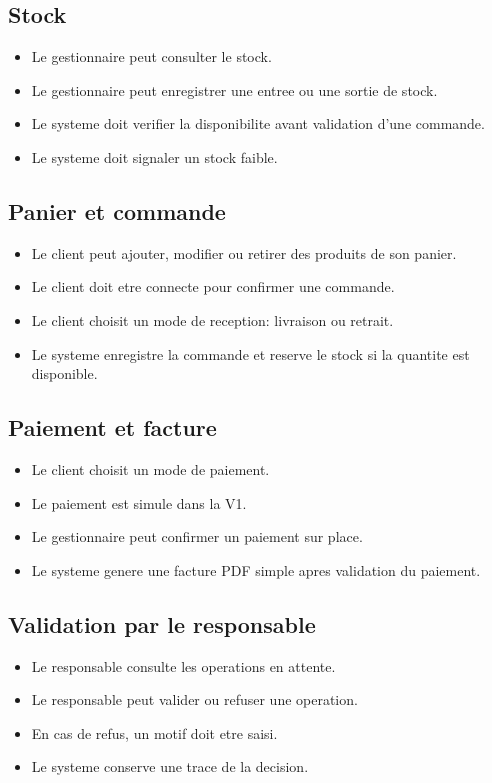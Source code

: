 \documentclass[12pt,a4paper]{article}
\begin{document}
\subsection{Stock}
\begin{itemize}
  \item Le gestionnaire peut consulter le stock.
  \item Le gestionnaire peut enregistrer une entree ou une sortie de stock.
  \item Le systeme doit verifier la disponibilite avant validation d'une commande.
  \item Le systeme doit signaler un stock faible.
\end{itemize}

\subsection{Panier et commande}
\begin{itemize}
  \item Le client peut ajouter, modifier ou retirer des produits de son panier.
  \item Le client doit etre connecte pour confirmer une commande.
  \item Le client choisit un mode de reception: livraison ou retrait.
  \item Le systeme enregistre la commande et reserve le stock si la quantite est disponible.
\end{itemize}

\subsection{Paiement et facture}
\begin{itemize}
  \item Le client choisit un mode de paiement.
  \item Le paiement est simule dans la V1.
  \item Le gestionnaire peut confirmer un paiement sur place.
  \item Le systeme genere une facture PDF simple apres validation du paiement.
\end{itemize}

\subsection{Validation par le responsable}
\begin{itemize}
  \item Le responsable consulte les operations en attente.
  \item Le responsable peut valider ou refuser une operation.
  \item En cas de refus, un motif doit etre saisi.
  \item Le systeme conserve une trace de la decision.
\end{itemize}
\end{document}

